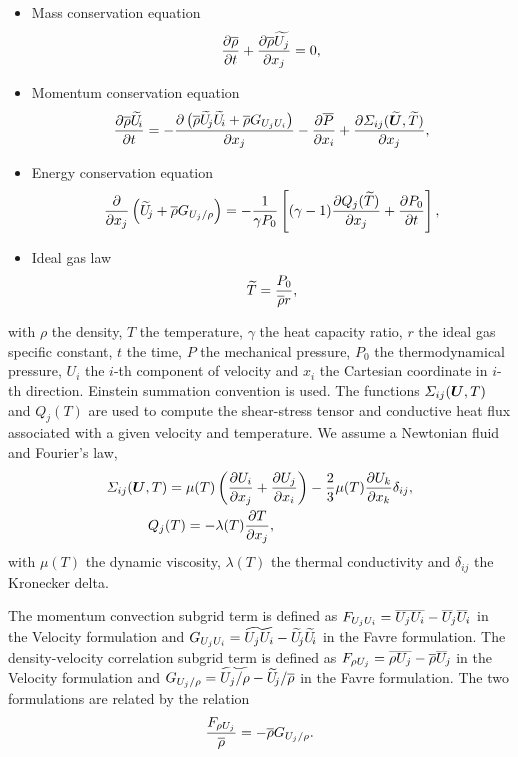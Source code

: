 \begin{itemize}
\item Mass conservation equation
\begin{equation}
\frac{\partial \overline{\rho}}{\partial t} + \frac{\partial \overline{\rho} \widetilde{U_{j}}}{\partial x_j} = 0,
\end{equation}
\item Momentum conservation equation
\begin{equation}
\begin{aligned}
\frac{\partial \overline{\rho} \widetilde{U}_{\!i}}{\partial t} = - \frac{\partial \left(\smash[t]{\overline{\rho} \widetilde{U}_{\!j} \widetilde{U}_{\!i} + \overline{\rho} G_{U_j U_i}}\right)}{\partial x_j} - \frac{\partial \overline{P}}{\partial x_i} + \frac{\partial \varSigma_{ij}(\boldsymbol{\widetilde{U}},\widetilde{T})}{\partial x_j},
\end{aligned}
\end{equation}
\item Energy conservation equation
\begin{equation}
\frac{\partial }{\partial x_j}\left(\widetilde{U}_{\!j} + \overline{\rho} G_{U_j/\rho}\right) = - \frac{1}{\gamma P_{0}}\left[ (\gamma - 1)\frac{\partial Q_j(\widetilde{T})}{\partial x_j} + \frac{\partial P_{0}}{\partial t} \right],
\end{equation}
\item Ideal gas law
\begin{equation}
\widetilde{T} = \frac{P_{0}}{\overline{\rho} r},
\end{equation}
\end{itemize}
with $\rho$ the density, $T$ the temperature, $\gamma$ the heat capacity ratio,
$r$ the ideal gas specific constant, $t$ the time, $P$ the mechanical pressure,
$P_0$ the thermodynamical pressure, $U_i$ the $i$-th component of velocity and
$x_i$ the Cartesian coordinate in $i$-th direction. Einstein summation
convention is used.
The functions $\varSigma_{ij}(\boldsymbol{U}, T)$ and $Q_j(T)$ are used to compute the
shear-stress tensor and conductive heat flux associated with a given velocity
and temperature. We assume a Newtonian fluid
and Fourier's law,
\begin{align}
\varSigma_{ij}(\boldsymbol{U}, T) ={}& \mu(T) \left(\frac{\partial U_i}{\partial x_j} + \frac{\partial U_j}{\partial x_i}\right) - \frac{2}{3} \mu(T) \frac{\partial U_k}{\partial x_k} \delta_{ij}, \\
Q_j(T) {}&= - \lambda(T) \frac{\partial T}{\partial x_j},
\end{align}
with $\mu(T)$ the dynamic viscosity, $\lambda(T)$ the thermal conductivity and
$\delta_{ij}$ the Kronecker delta.

The momentum convection subgrid term is defined as
$\smash[t]{F_{U_j U_i} ={} \overline{U_j U_i} - \overline{U}_{\!j} \overline{U}_{\!i}}$ in the Velocity formulation and
$\smash[t]{G_{U_j U_i} ={} \widetilde{U_j U_i} - \widetilde{U}_{\!j} \widetilde{U}_{\!i}}$ in the Favre formulation.
The density-velocity correlation subgrid term is defined as
$\smash[t]{F_{\rho U_j} ={} \overline{\rho U_j} - \overline{\rho} \overline{U}_{\!j}}$ in the Velocity formulation and
$\smash[t]{G_{U_j/\rho} ={} \widetilde{U_j/\rho} - \widetilde{U}_{\!j}/\overline{\rho}}$ in the Favre formulation.
The two formulations are related by the relation
\begin{equation}
\frac{F_{\rho U_j}}{\overline{\rho}} = - \overline{\rho} G_{U_j/\rho}.
\end{equation}




